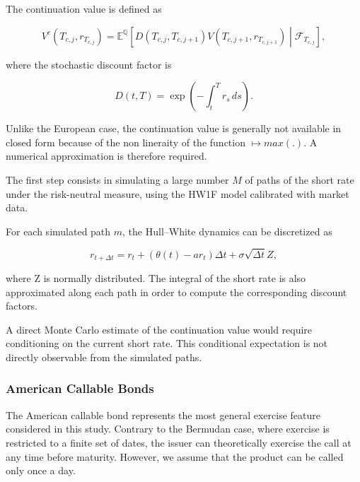 \documentclass{article}
\begin{document}
The continuation value is defined as

\begin{equation}
    V^c(T_{c,j},r_{T_{c,j}})
    =
    \mathbb{E}^{\mathbb{Q}}
    \left[
        D(T_{c,j},T_{c,j+1})
        V(T_{c,j+1},r_{T_{c,j+1}})
        \middle|
        \mathcal{F}_{T_{c,j}}
    \right],
\end{equation}

where the stochastic discount factor is

\begin{equation}
    D(t,T)
    =
    \exp
    \left(
        -\int_t^T r_s\,ds
    \right).
\end{equation}

Unlike the European case, the continuation value is generally not
available in closed form because of the non lineraity of the function $\longmapsto max(.)$. A numerical approximation is therefore
required.


The first step consists in simulating a large number $M$ of paths
of the short rate under the risk-neutral measure, using the HW1F model calibrated with market data.

For each simulated path $m$, the Hull--White dynamics can be
discretized as

\begin{equation}
    r_{t+\Delta t}
    =
    r_t
    +
    \left(
        \theta(t)-ar_t
    \right)\Delta t
    +
    \sigma\sqrt{\Delta t}Z,
\end{equation}

where Z is normally distributed. The integral of the short rate is also approximated along each path in order to compute the corresponding discount factors.

A direct Monte Carlo estimate of the continuation value would
require conditioning on the current short rate. This conditional
expectation is not directly observable from the simulated paths.


\subsubsection{American Callable Bonds}

The American callable bond represents the most general exercise
feature considered in this study. Contrary to the Bermudan case,
where exercise is restricted to a finite set of dates, the issuer
can theoretically exercise the call at any time before maturity. However, we assume that the product can be called only once a day.
\end{document}
